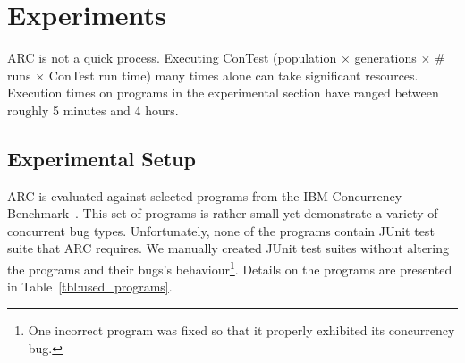 \section{Experiments}
\label{sec:experiments}


ARC is not a quick process. Executing ConTest (population $\times$ generations
$\times$ \# runs $\times$ ConTest run time) many times alone can take
significant resources. Execution times on programs in the experimental section
have ranged between roughly 5 minutes and 4 hours.

\subsection{Experimental Setup}
\label{sec:experimental_setup}

ARC is evaluated against selected programs from the IBM Concurrency
Benchmark~\cite{EHSU06}. This set of programs is rather small yet demonstrate a
variety of concurrent bug types. Unfortunately, none of the programs contain
JUnit test suite that ARC requires. We manually created JUnit test suites
without altering the programs and their bugs's behaviour\footnote{One incorrect
program was fixed so that it properly exhibited its concurrency bug.}. Details
on the programs are presented in Table~\ref{tbl:used_programs}.

